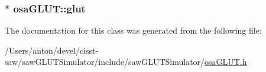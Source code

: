 \subsubsection[{glut}]{$\ast$ osa\+G\+L\+U\+T\+::glut\hspace{0.3cm}{\ttfamily [static]}}\label{classosa_g_l_u_t_a0938d441aa9a2fdd199d00172ceca18c}


The documentation for this class was generated from the following file\+:\begin{DoxyCompactItemize}
\item 
/\+Users/anton/devel/cisst-\/saw/saw\+G\+L\+U\+T\+Simulator/include/saw\+G\+L\+U\+T\+Simulator/\hyperlink{osa_g_l_u_t_8h}{osa\+G\+L\+U\+T.\+h}\end{DoxyCompactItemize}
